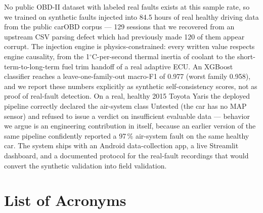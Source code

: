 No public OBD-II dataset with labeled real faults exists at this sample rate,
so we trained on synthetic faults injected into 84.5 hours of real healthy
driving data from the public carOBD corpus --- 129 sessions that we recovered
from an upstream CSV parsing defect which had previously made 120 of them
appear corrupt. The injection engine is physics-constrained: every written
value respects engine causality, from the 1$^{\circ}$C-per-second thermal
inertia of coolant to the short-term-to-long-term fuel trim handoff of a real
adaptive ECU. An XGBoost classifier reaches a leave-one-family-out macro-F1
of 0.977 (worst family 0.958), and we report these numbers explicitly as
synthetic self-consistency scores, not as proof of real-fault detection. On a
real, healthy 2015 Toyota Yaris the deployed pipeline correctly declared the
air-system class Untested (the car has no MAP sensor) and refused to issue a
verdict on insufficient evaluable data --- behavior we argue is an
engineering contribution in itself, because an earlier version of the same
pipeline confidently reported a 97\,\% air-system fault on the same healthy
car. The system ships with an Android data-collection app, a live Streamlit
dashboard, and a documented protocol for the real-fault recordings that would
convert the synthetic validation into field validation.

\clearpage
\tableofcontents
\clearpage
\listoffigures
{}
\listoftables
{}

\clearpage
\section*{List of Acronyms}

